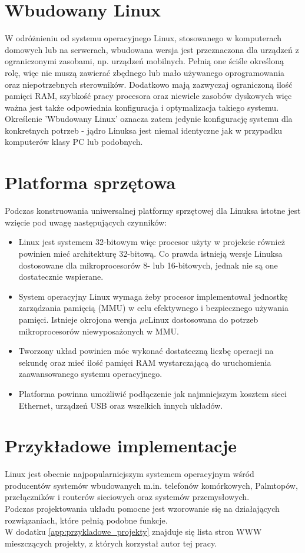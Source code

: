 \documentclass[a4paper,12pt]{book}
\begin{document}
		\section{Wbudowany Linux}
			W odróżnieniu od systemu operacyjnego Linux, stosowanego w komputerach domowych lub na serwerach, wbudowana wersja jest przeznaczona dla urządzeń z ograniczonymi zasobami, np. urządzeń mobilnych. Pełnią one ściśle określoną rolę, więc nie muszą zawierać zbędnego lub mało używanego oprogramowania oraz niepotrzebnych sterowników. Dodatkowo mają zazwyczaj ograniczoną ilość pamięci RAM, szybkość pracy procesora oraz niewiele zasobów dyskowych więc ważna jest także odpowiednia konfiguracja i optymalizacja takiego systemu.\\
			Określenie 'Wbudowany Linux' oznacza zatem jedynie konfigurację systemu dla konkretnych potrzeb - jądro Linuksa jest niemal identyczne jak w przypadku komputerów klasy PC lub podobnych.
		\section{Platforma sprzętowa}
			Podczas konstruowania uniwersalnej platformy sprzętowej dla Linuksa istotne jest wzięcie pod uwagę następujących czynników:
			\begin{itemize}
				\item Linux jest systemem 32-bitowym więc procesor użyty w projekcie również powinien mieć architekturę 32-bitową. Co prawda istnieją wersje Linuksa dostosowane dla mikroprocesorów 8- lub 16-bitowych, jednak nie są one dostatecznie wspierane.
				\item System operacyjny Linux wymaga żeby procesor implementował jednostkę zarządzania pamięcią (MMU) w celu efektywnego i bezpiecznego używania pamięci. Istnieje okrojona wersja $\mu$cLinux\cite{uclinux} dostosowana do potrzeb mikroprocesorów niewyposażonych w MMU.
				\item Tworzony układ powinien móc wykonać dostateczną liczbę operacji na sekundę oraz mieć ilość pamięci RAM wystarczającą do uruchomienia zaawansowanego systemu operacyjnego.
				\item Platforma powinna umożliwić podłączenie jak najmniejszym kosztem sieci Ethernet, urządzeń USB oraz wszelkich innych układów.
			\end{itemize}
		\section{Przykładowe implementacje}
			Linux jest obecnie najpopularniejszym systemem operacyjnym wśród producentów systemów wbudowanych m.in. telefonów komórkowych, Palmtopów, przełączników i routerów sieciowych oraz systemów przemysłowych.\\
			Podczas projektowania układu pomocne jest wzorowanie się na działających rozwiązaniach, które pełnią podobne funkcje.\\
			W dodatku \ref{app:przykladowe_projekty} znajduje się lista stron WWW mieszczących projekty, z których korzystał autor tej pracy.
\end{document}
